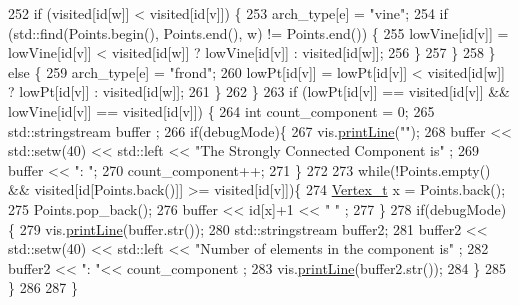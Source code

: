 \begin{DoxyCode}
252             \textcolor{keywordflow}{if} (visited[\textcolor{keywordtype}{id}[w]] < visited[\textcolor{keywordtype}{id}[v]]) \{
253                 arch\_type[e] = \textcolor{stringliteral}{"vine"};
254                 \textcolor{keywordflow}{if} (std::find(Points.begin(), Points.end(), w) != Points.end()) \{
255                     lowVine[\textcolor{keywordtype}{id}[v]] = lowVine[\textcolor{keywordtype}{id}[v]] < visited[\textcolor{keywordtype}{id}[w]] ? lowVine[\textcolor{keywordtype}{id}[v]] : visited[\textcolor{keywordtype}{id}[w]];
256                 \}
257             \}
258         \} \textcolor{keywordflow}{else} \{
259             arch\_type[e] = \textcolor{stringliteral}{"frond"};
260             lowPt[\textcolor{keywordtype}{id}[v]] = lowPt[\textcolor{keywordtype}{id}[v]] < visited[\textcolor{keywordtype}{id}[w]] ? lowPt[\textcolor{keywordtype}{id}[v]] : visited[\textcolor{keywordtype}{id}[w]];
261         \}
262     \}
263     \textcolor{keywordflow}{if} (lowPt[\textcolor{keywordtype}{id}[v]] == visited[\textcolor{keywordtype}{id}[v]] && lowVine[\textcolor{keywordtype}{id}[v]] == visited[\textcolor{keywordtype}{id}[v]]) \{
264             \textcolor{keywordtype}{int} count\_component = 0;
265             std::stringstream buffer ;
266             \textcolor{keywordflow}{if}(debugMode)\{
267                 vis.\hyperlink{class_visualize_abce6cd538dc0715b21851e0bf0377d85}{printLine}(\textcolor{stringliteral}{""});
268                 buffer << std::setw(40) << std::left << \textcolor{stringliteral}{"The Strongly Connected Component is"} ;
269                  buffer << \textcolor{stringliteral}{": "};
270                  count\_component++;
271             \}
272             
273         \textcolor{keywordflow}{while}(!Points.empty() && visited[\textcolor{keywordtype}{id}[Points.back()]] >= visited[\textcolor{keywordtype}{id}[v]])\{
274             \hyperlink{utilities_8h_a344cd987714d06997f0becda3c96d6e2}{Vertex\_t} x = Points.back();
275             Points.pop\_back();
276             buffer << \textcolor{keywordtype}{id}[x]+1 <<  \textcolor{stringliteral}{" "} ;
277         \}
278        \textcolor{keywordflow}{if}(debugMode)\{
279         vis.\hyperlink{class_visualize_abce6cd538dc0715b21851e0bf0377d85}{printLine}(buffer.str());
280         std::stringstream buffer2;
281         buffer2 << std::setw(40) << std::left << \textcolor{stringliteral}{"Number of elements in the component is"} ;
282         buffer2 << \textcolor{stringliteral}{": "}<< count\_component ;
283         vis.\hyperlink{class_visualize_abce6cd538dc0715b21851e0bf0377d85}{printLine}(buffer2.str());
284        \}
285     \}
286 
287 \}
\end{DoxyCode}


